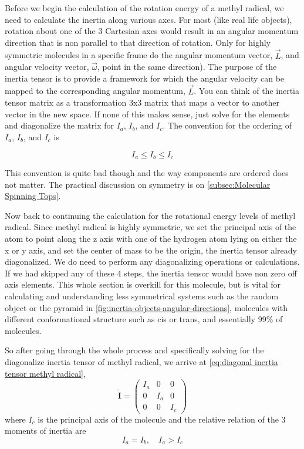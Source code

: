 \documentclass[11pt,a4paper]{book}
\begin{document}
			Before we begin the calculation of the rotation energy of a methyl radical, we need to calculate the inertia along various axes. For most  (like real life objects), rotation about one of the 3 Cartesian axes would result in an angular momentum direction that is non parallel to that direction of rotation. Only for highly symmetric molecules in a specific frame do the angular momentum vector, $\vec{L}$, and angular velocity vector, $\vec{\omega}$, point in the same direction). The purpose of the inertia tensor is to provide a framework for which the angular velocity can be mapped to the corresponding angular momentum, $\vec{L}$. You can think of the inertia tensor matrix as a transformation 3x3 matrix that maps a vector to another vector in the new space. If none of this makes sense, just solve for the elements and diagonalize the matrix for $I_a$, $I_b$, and $I_c$. The convention for the ordering of $I_a$, $I_b$, and $I_c$ is
			
			\begin{equation}
				I_a \leq I_b \leq I_c
			\end{equation}
			
			\noindent
			This convention is quite bad though and the way components are ordered does not matter. The practical discussion on symmetry is on \autoref{subsec:Molecular Spinning Tops}.
			
			Now back to continuing the calculation for the rotational energy levels of methyl radical. Since methyl radical is highly symmetric, we set the principal axis of the atom to point along the z axis with one of the hydrogen atom lying on either the x or y axis, and set the center of mass to be the origin, the inertia tensor already diagonalized. We do need to perform any diagonalizing operations or calculations. If we had skipped any of these 4 steps, the inertia tensor would have non zero off axis elements. This whole section is overkill for this molecule, but is vital for calculating and understanding less symmetrical systems such as the random object or the pyramid in \autoref{fig:inertia-objects-angular-directions}, molecules with different conformational structure such as cis or trans, and essentially 99\% of molecules.
			
			So after going through the whole process and specifically solving for the diagonalize inertia tensor of methyl radical, we arrive at \autoref{eq:diagonal inertia tensor methyl radical},
			\begin{equation}
				\label{eq:diagonal inertia tensor methyl radical}
				\tilde{\textbf{I}}= 
					\begin{pmatrix}
						I_{a} & 0 & 0\\
						0 & I_{a} & 0\\
						0 & 0 & I_{c}
					\end{pmatrix}
			\end{equation}
			where $I_c$ is the principal axis of the molecule and the relative relation of the 3 moments of inertia are
			\begin{equation}
				\label{eq:inertia tensor elements of methyl radical}
					I_a = I_b, \quad I_a > I_c
			\end{equation}
			
\end{document}
